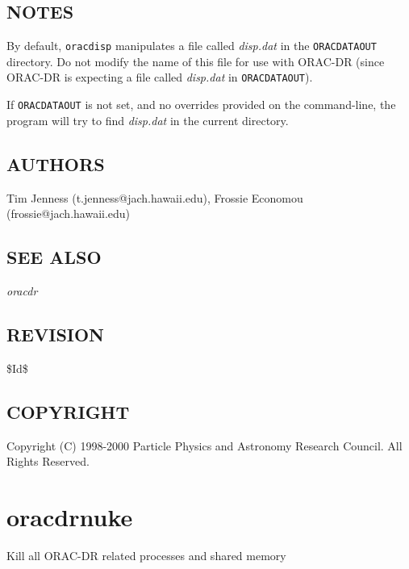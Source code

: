 \documentclass[twoside,11pt]{article}
\renewcommand{\_}{\texttt{\symbol{95}}}
\begin{document}
\subsection*{NOTES\label{oracdisp_NOTES}}


By default, \texttt{oracdisp} manipulates a file called \emph{disp.dat}
in the \texttt{ORAC\_DATA\_OUT} directory. Do not modify the name of this
file for use with ORAC-DR (since ORAC-DR is expecting a file
called \emph{disp.dat} in \texttt{ORAC\_DATA\_OUT}).



If \texttt{ORAC\_DATA\_OUT} is not set, and no overrides provided on the
command-line, the program will try to find \emph{disp.dat} in the current
directory.

\subsection*{AUTHORS\label{oracdisp_AUTHORS}}


Tim Jenness (t.jenness@jach.hawaii.edu),
Frossie Economou (frossie@jach.hawaii.edu)

\subsection*{SEE ALSO\label{oracdisp_SEE_ALSO}}


\emph{oracdr}

\subsection*{REVISION\label{oracdisp_REVISION}}


\$Id\$

\subsection*{COPYRIGHT\label{oracdisp_COPYRIGHT}}


Copyright (C) 1998-2000 Particle Physics and Astronomy Research 
Council. All Rights Reserved.


\section{oracdr\_nuke\label{oracdr_nuke}}


Kill all ORAC-DR related processes and shared memory
\end{document}
